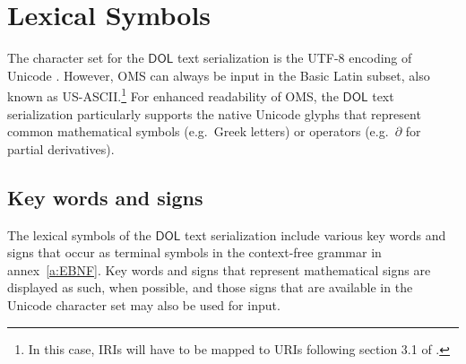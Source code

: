 \documentclass[10pt,fleqn,final]{scrreprt}
\makeatletter
\newcommand*\CommentAuthor{}
\renewcommand*\CommentAuthor{#1}}
\newcommand*\CommentDate{}
\renewcommand*\CommentDate{#1}}
\newcommand*\CommentId{}
\renewcommand*\CommentId{#1}}
\newcommand*\CommentType{}
\renewcommand*\CommentType{#1}}
\newcommand*{\SetCommentColorByType}[1]{%
\edef\localType{{#1}}%
\expandafter\ifstrequal\localType{q-aut}{\colorlet{CommentColor}{red}}{%
\expandafter\ifstrequal\localType{q-all}{\colorlet{CommentColor}{orange}}{%
\expandafter\ifstrequal\localType{todo}{\colorlet{CommentColor}{orange}}{%
\expandafter\ifstrequal\localType{fyi}{\colorlet{CommentColor}{lightgray}}{%
\colorlet{CommentColor}{yellow}}}}}}
\newcommand*{\SetCommentPrefixByType}[1]{%
\edef\localType{{#1}}%
\expandafter\@ifmtarg\localType{%
\edef\CommentPrefix{}%
}{%
\caseupper[q]{#1}%
\edef\CommentPrefix{\thestring: }%
}}
\newcommand*{\initComment}[1]{%
\setkeys{Comment}{#1}%
\SetCommentColorByType{\CommentType}%
\relax%
\SetCommentPrefixByType{\CommentType}%
\relax%
}
\newcommand*{\todonote}[2][]{%
\initComment{#1}%
\pdfcomment[author=\CommentAuthor,color=CommentColor,date=\CommentDate,id=\CommentId]{%
\CommentPrefix
#2}}
\renewcommand*{\todonote}[2][]{%
\initComment{#1}%
\ednote{\CommentPrefix #2}}
\newcommand*{\syntax}[1]{\texttt{#1}}
\newcommand*{\notallowed}{\textbf{not allowed}\xspace}
\newcommand*{\DOL}{\ensuremath{\mathsf{DOL}}\xspace}
\newcommand{\annexrefname}{annex}
\newcommand{\noterefname}{note}
\newcommand{\aref}[1]{\annexrefname~\ref{#1}}
\newcommand{\nref}[1]{\noterefname~\ref{#1}}
\newcommand{\sclause}[1]{\section{#1}}
\newcommand{\ssclause}[1]{\subsection{#1}}
\renewcommand{\nref}[1]{\ref{nref-#1}} %
\providecommand{\DIFadd}[1]{{\protect\color{blue}\uwave{#1}}} %
\providecommand{\DIFaddbegin}{} %
\providecommand{\DIFaddend}{} %
\providecommand{\DIFdelbegin}{} %
\providecommand{\DIFdelend}{} %
\makeatother
\begin{document}
%

\sclause{Lexical Symbols}

The character set for the \DOL text serialization is the UTF-8 encoding of Unicode \DIFdelbegin %
\DIFdelend \DIFaddbegin \DIFadd{\nref{UCS}}\DIFaddend .  However, OMS can always be input in the Basic Latin subset, also known as US-ASCII.\footnote{In this case, IRIs will have to be mapped to URIs following section 3.1 of \DIFdelbegin %
\DIFdelend \DIFaddbegin \DIFadd{\nref{IRI}}\DIFaddend .}  For enhanced readability of OMS, the \DOL text serialization particularly supports the native Unicode glyphs that represent common mathematical symbols (e.g.\ Greek letters)  or operators (e.g.\ $\partial$ for partial derivatives). %

\ssclause{Key words and signs}\label{c:keywords}

The lexical symbols of the \DOL text serialization include various key words and signs that occur as terminal symbols in the context-free grammar in \aref{a:EBNF}.   Key words and signs that represent mathematical signs are displayed as such, when possible, and those signs that are available in the Unicode character set may also be used for input.
\end{document}
